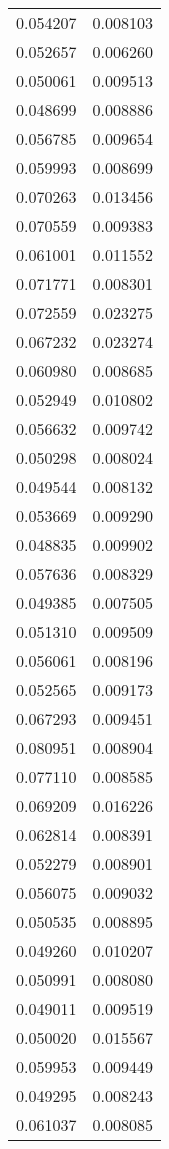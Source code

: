 \begin{longtable}[c]{ll}
    0.054207 & 0.008103 \\
    0.052657 & 0.006260 \\
    0.050061 & 0.009513 \\
    0.048699 & 0.008886 \\
    0.056785 & 0.009654 \\
    0.059993 & 0.008699 \\
    0.070263 & 0.013456 \\
    0.070559 & 0.009383 \\
    0.061001 & 0.011552 \\
    0.071771 & 0.008301 \\
    0.072559 & 0.023275 \\
    0.067232 & 0.023274 \\
    0.060980 & 0.008685 \\
    0.052949 & 0.010802 \\
    0.056632 & 0.009742 \\
    0.050298 & 0.008024 \\
    0.049544 & 0.008132 \\
    0.053669 & 0.009290 \\
    0.048835 & 0.009902 \\
    0.057636 & 0.008329 \\
    0.049385 & 0.007505 \\
    0.051310 & 0.009509 \\
    0.056061 & 0.008196 \\
    0.052565 & 0.009173 \\
    0.067293 & 0.009451 \\
    0.080951 & 0.008904 \\
    0.077110 & 0.008585 \\
    0.069209 & 0.016226 \\
    0.062814 & 0.008391 \\
    0.052279 & 0.008901 \\
    0.056075 & 0.009032 \\
    0.050535 & 0.008895 \\
    0.049260 & 0.010207 \\
    0.050991 & 0.008080 \\
    0.049011 & 0.009519 \\
    0.050020 & 0.015567 \\
    0.059953 & 0.009449 \\
    0.049295 & 0.008243 \\
    0.061037 & 0.008085 \\

\end{longtable}
